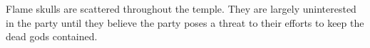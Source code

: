 Flame skulls are scattered throughout the temple.
They are largely uninterested in the party until they believe the party poses a threat to their efforts to keep the dead gods contained.
